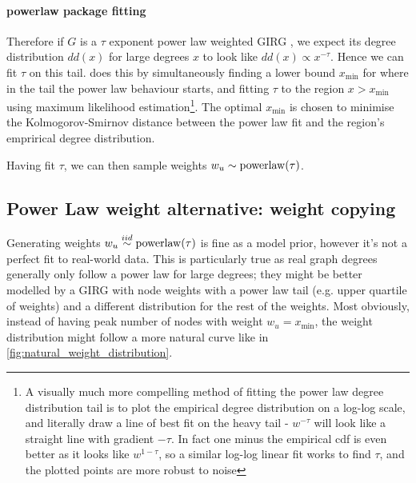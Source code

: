 \paragraph{powerlaw package fitting}
Therefore if $G$ is a $\tau$ exponent power law weighted GIRG , we expect its degree distribution $dd(x)$ for large degrees $x$ to look like $dd(x) \propto x^{-\tau}$. Hence we can fit $\tau$ on this tail. \PLP does this by simultaneously finding a lower bound $x_{\min}$ for where in the tail the power law behaviour starts, and fitting $\tau$ to the region $x > x_{\min}$ using maximum likelihood estimation\footnote{A visually much more compelling method of fitting the power law degree distribution tail is to plot the empirical degree distribution on a log-log scale, and literally draw a line of best fit on the heavy tail - $w^{-\tau}$ will look like a straight line with gradient $-\tau$. In fact one minus the empirical cdf is even better as it looks like $w^{1-\tau}$, so a similar log-log linear fit works to find $\tau$, and the plotted points are more robust to noise}. The optimal $x_{\min}$ is chosen to minimise the Kolmogorov-Smirnov distance between the power law fit and the region's emprirical degree distribution.

Having fit $\tau$, we can then sample weights $w_u \sim \operatorname{powerlaw}(\tau)$.


\subsection{Power Law weight alternative: weight copying}
Generating weights $w_u \stackrel{iid}{\sim} \operatorname{powerlaw}(\tau)$ is fine as a model prior, however it's not a perfect fit to real-world data. This is particularly true as real graph degrees generally only follow a power law for large degrees; they might be better modelled by a GIRG with node weights with a power law tail (e.g. upper quartile of weights) and a different distribution for the rest of the weights. Most obviously, instead of having peak number of nodes with weight $w_u = x_{\min}$, the weight distribution might follow a more natural curve like in \cref{fig:natural_weight_distribution}.


